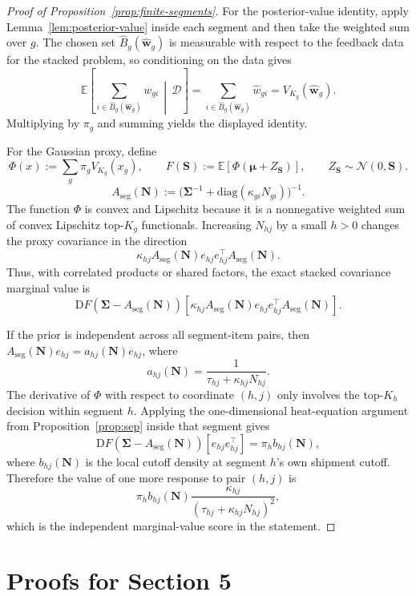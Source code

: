 \documentclass[11pt]{article}
\theoremstyle{definition}
\theoremstyle{remark}
\newcommand{\E}{\mathbb{E}}
\newcommand{\1}{\mathbf{1}}
\newcommand{\w}{\mathbf{w}}
\newcommand{\diag}{\mathrm{diag}}
\newcommand{\Normal}{\mathcal{N}}
\newcommand{\bmu}{\boldsymbol{\mu}}
\newcommand{\bSigma}{\boldsymbol{\Sigma}}
\newcommand{\N}{\mathbf{N}}
\newcommand{\bS}{\mathbf{S}}
\newcommand{\cD}{\mathcal{D}}
\begin{document}
\begin{proof}[Proof of Proposition~\ref{prop:finite-segments}]
For the posterior-value identity, apply Lemma~\ref{lem:posterior-value}
inside each segment and then take the weighted sum over \(g\). The chosen
set \(\hat B_g(\hat{\w}_g)\) is measurable with respect to the feedback
data for the stacked problem, so conditioning on the data gives
\[
\E\!\left[\sum_{i\in \hat B_g(\hat{\w}_g)} w_{gi}\,\middle|\,\cD\right]
=
\sum_{i\in \hat B_g(\hat{\w}_g)} \hat w_{gi}
=
V_{K_g}(\hat{\w}_g).
\]
Multiplying by \(\pi_g\) and summing yields the displayed identity.

For the Gaussian proxy, define
\[
\Phi(x):=\sum_g\pi_g V_{K_g}(x_g),
\qquad
F(\bS):=\E[\Phi(\bmu+Z_{\bS})],
\qquad Z_{\bS}\sim\Normal(0,\bS).
\]
\[
A_{\mathrm{seg}}(\N):=
\big(\bSigma^{-1}+\diag(\kappa_{gi}N_{gi})\big)^{-1}.
\]
The function \(\Phi\) is convex and Lipschitz because it is a
nonnegative weighted sum of convex Lipschitz top-\(K_g\) functionals.
Increasing \(N_{hj}\) by a small \(h>0\) changes the proxy covariance in
the direction
\[
\kappa_{hj}A_{\mathrm{seg}}(\N)e_{hj}e_{hj}^{\top}
A_{\mathrm{seg}}(\N).
\]
Thus, with correlated products or shared factors, the exact stacked
covariance marginal value is
\[
\mathrm{D}F\!\left(\bSigma-A_{\mathrm{seg}}(\N)\right)
\!\left[
\kappa_{hj}A_{\mathrm{seg}}(\N)e_{hj}e_{hj}^{\top}
A_{\mathrm{seg}}(\N)
\right].
\]

If the prior is independent across all segment-item pairs, then
\(A_{\mathrm{seg}}(\N)e_{hj}=a_{hj}(\N)e_{hj}\), where
\[
a_{hj}(\N)=\frac{1}{\tau_{hj}+\kappa_{hj}N_{hj}}.
\]
The derivative of \(\Phi\) with respect to coordinate \((h,j)\) only
involves the top-\(K_h\) decision within segment \(h\). Applying the
one-dimensional heat-equation argument from Proposition~\ref{prop:sep}
inside that segment gives
\[
\mathrm{D}F(\bSigma-A_{\mathrm{seg}}(\N))[e_{hj}e_{hj}^{\top}]
=\pi_h b_{hj}(\N),
\]
where \(b_{hj}(\N)\) is the local cutoff density at segment \(h\)'s
own shipment cutoff.
Therefore the value of one more response to pair
\((h,j)\) is
\[
\pi_h b_{hj}(\N)
\frac{\kappa_{hj}}{(\tau_{hj}+\kappa_{hj}N_{hj})^2},
\]
which is the independent marginal-value score in the statement.
\end{proof}

\section{Proofs for Section 5}
\end{document}
